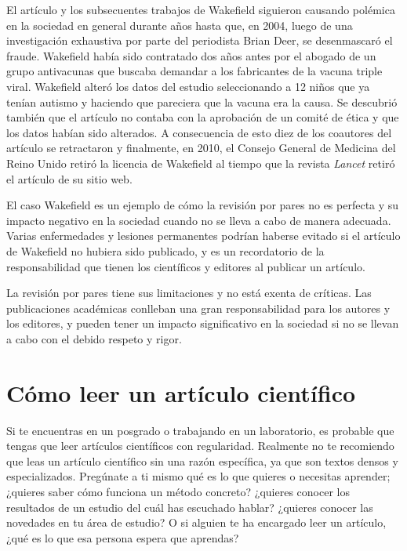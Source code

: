 El artículo y los subsecuentes trabajos de Wakefield siguieron causando polémica
en la sociedad en general durante años hasta que, en 2004, luego de una
investigación exhaustiva por parte del periodista Brian Deer, se desenmascaró el
fraude\cite{Deerc1127}.
Wakefield había sido contratado dos años antes por el abogado de un grupo
antivacunas que buscaba demandar a los fabricantes de la vacuna triple viral.
Wakefield alteró los datos del estudio seleccionando a 12 niños que ya tenían
autismo y haciendo que pareciera que la vacuna era la causa.
Se descubrió también que el artículo no contaba con la aprobación de un comité
de ética y que los datos habían sido alterados.
A consecuencia de esto diez de los coautores del artículo se retractaron y
finalmente, en 2010, el Consejo General de Medicina del Reino Unido retiró la
licencia de Wakefield al tiempo que la revista \emph{Lancet} retiró el artículo
de su sitio web.

El caso Wakefield es un ejemplo de cómo la revisión por pares no es perfecta y
su impacto negativo en la sociedad cuando no se lleva a cabo de manera
adecuada.
Varias enfermedades y lesiones permanentes podrían haberse evitado si el
artículo de Wakefield no hubiera sido publicado, y es un recordatorio de la
responsabilidad que tienen los científicos y editores al publicar un artículo.

\begin{remember}
    La revisión por pares tiene sus limitaciones y no está exenta de críticas.
    Las publicaciones académicas conlleban una gran responsabilidad para los
    autores y los editores, y pueden tener un impacto significativo en la
    sociedad si no se llevan a cabo con el debido respeto y rigor.
\end{remember}

\section{Cómo leer un artículo científico}
\label{sec:comoleer}

Si te encuentras en un posgrado o trabajando en un laboratorio, es probable que
tengas que leer artículos científicos con regularidad.
Realmente no te recomiendo que leas un artículo científico sin una razón
específica, ya que son textos densos y especializados.
Pregúnate a ti mismo qué es lo que quieres o necesitas aprender; ¿quieres saber
cómo funciona un método concreto? ¿quieres conocer los resultados de un estudio
del cuál has escuchado hablar? ¿quieres conocer las novedades en tu área de
estudio? O si alguien te ha encargado leer un artículo, ¿qué es lo que esa
persona espera que aprendas?

